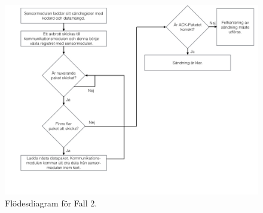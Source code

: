 \documentclass[a4paper,12pt,fleqn]{article}
\begin{document}
\begin{figure}[htp] %
  \begin{center}
  \includegraphics[keepaspectratio=true,width=\linewidth]{SPIbild003.jpg}  %
  \end{center}
  \caption{Flödesdiagram för Fall 2.} %
  \label{fig:case2flow}
\end{figure}
\end{document}
